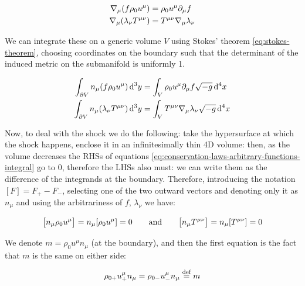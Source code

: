\documentclass[main.tex]{subfiles}
\begin{document}
\begin{subequations} \label{eq:conservation-laws-arbitrary-functions}
\begin{align}
  \nabla_\mu \qty(f \rho_0 u^\mu) &= \rho_0 u^\mu \partial_\mu f  \\
  \nabla_\mu \qty(\lambda_\nu T^{\mu\nu})&= T^{\mu\nu} \nabla_\mu \lambda_\nu
\end{align}
\end{subequations}

We can integrate these on a generic volume \(V\) using Stokes' theorem \eqref{eq:stokes-theorem}, choosing coordinates on the boundary such that the determinant of the induced metric on the submanifold is uniformly 1.

\begin{subequations} \label{eq:conservation-laws-arbitrary-functions-integral}
    \begin{align}
        \int _{\partial V} n_\mu \qty(f \rho_0 u^\mu) \dd[3]{y} &= \int_V \rho_0 u^\mu \partial_\mu f \sqrt{-g}  \dd[4]{x}  \\
        \int_{\partial V} n_\mu \qty(\lambda_\nu T^{\mu\nu}) \dd[3]{y}&= \int _V T^{\mu\nu} \nabla_\mu \lambda_\nu \sqrt{-g}  \dd[4]{x}
    \end{align}
\end{subequations}

Now, to deal with the shock we do the following: take the hypersurface at which the shock happens, enclose it in an infinitesimally thin 4D volume: then, as the volume decreases the RHSs of equations \eqref{eq:conservation-laws-arbitrary-functions-integral} go to 0, therefore the LHSs also must: we can write them as the difference of the integrands at the boundary.
Therefore, introducing the notation \([F] = F_+ - F_-\), selecting one of the two outward vectors and denoting only it as \(n_\mu\) and using the arbitrariness of \(f\), \(\lambda_\nu\) we have:

\begin{equation}
    \qty[n_\mu \rho_0 u^\mu] = n_\mu \qty[\rho_0 u^\mu] = 0
    \qquad
    \text{and}
    \qquad
    \qty[n_\mu T^{\mu\nu}] = n_\mu [T^{\mu\nu}] = 0
\end{equation}

We denote \(m = \rho_0 u^\mu n_\mu\) (at the boundary), and then the first equation is the fact that \(m\) is the same on either side:

\begin{equation} \label{eq:rankine-hugoniot-1}
    \rho_{0+} u^\mu_+ n_\mu =
    \rho_{0-} u^\mu_- n_\mu \stackrel{\text{def}}{=} m
\end{equation}
\end{document}
